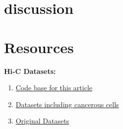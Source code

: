 \documentclass[a4,center,fleqn]{NAR}
\begin{document}
\section{discussion}
\newpage
\section{Resources}
\textbf{Hi-C Datasets:}
\begin{enumerate}
    \item \href{https://github.com/rasoolianbehnam/watson}{Code base for this article}
    \item \href{http://sysbio.rnet.missouri.edu/T0510/tmp_download/link_to_download_genome_data/}
        {Datasets including cancerous cells}
    \item \href{https://bcm.app.box.com/v/aidenlab/folder/11234760671}{Original Datasets}
\end{enumerate}




\end{document}
